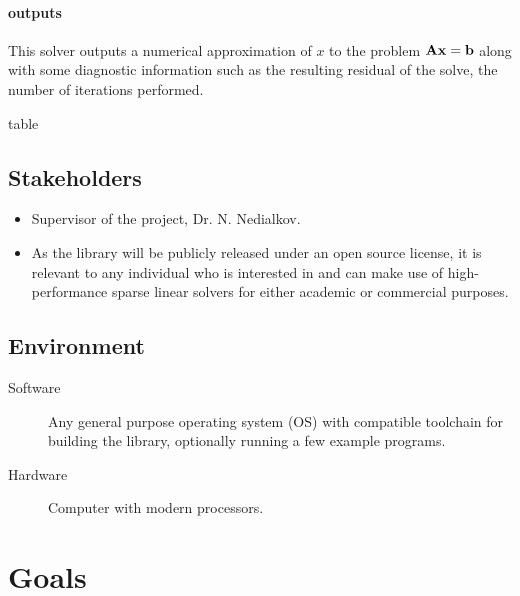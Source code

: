 \documentclass{article}
\begin{document}
\paragraph{outputs}

This solver outputs a numerical approximation of \(x\) to the problem
\(\mathbf{A}\mathbf{x} = \mathbf{b}\) along with some diagnostic information such as the
resulting residual of the solve, the number of iterations performed.

table

\subsection{Stakeholders}

\begin{itemize}
\item Supervisor of the project, Dr. N. Nedialkov.
\item As the library will be publicly released under an open source license, it is
  relevant to any individual who is interested in and can make use of
  high-performance sparse linear solvers for either academic or commercial
  purposes.
\end{itemize}

\subsection{Environment}


\begin{description}
\item[Software] Any general purpose operating system (OS) with compatible toolchain
  for building the library, optionally running a few example programs.
\item[Hardware] Computer with modern processors.
\end{description}

\section{Goals}
\end{document}
